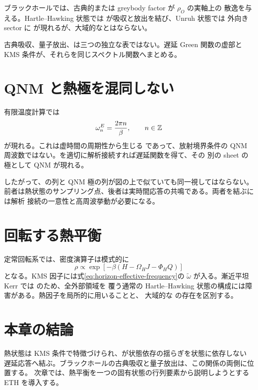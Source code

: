 ブラックホールでは、古典的または greybody factor が $\rho_O$ の実軸上の
散逸を与える。Hartle--Hawking 状態では が吸収と放出を結び、Unruh 状態では
外向き sector に が現れるが、大域的なとはならない。

\begin{principlebox}
古典吸収、量子放出、は三つの独立な表ではない。遅延 Green 関数の虚部と
KMS 条件が、それらを同じスペクトル関数へまとめる。
\end{principlebox}

\section{QNM と熱極を混同しない}

有限温度計算では 
\begin{equation}
\omega_n^{E}
=
\frac{2\pi n}{\beta},
\qquad
n\in\mathbb{Z}
\label{eq:bosonic-matsubara}
\end{equation}
が現れる。これは虚時間の周期性から生じる であって、放射境界条件の
QNM 周波数ではない。を適切に解析接続すれば遅延関数を得て、その
別の sheet の極として QNM が現れる。

したがって、の列と QNM 極の列が図の上で似ていても同一視してはならない。
前者は熱状態のサンプリング点、後者は実時間応答の共鳴である。両者を結ぶには解析
接続の一意性と高周波挙動が必要になる。

\section{回転する熱平衡}

定常回転系では、密度演算子は模式的に
\begin{equation}
\rho
\mathrel{\propto}
\exp\left[
-\beta
\left(
H-\Omega_H J-\Phi_H Q
\right)
\right]
\label{eq:rotating-gibbs}
\end{equation}
となる。KMS 因子には式\eqref{eq:horizon-effective-frequency}の
$\widetilde\omega$ が入る。漸近平坦 Kerr では  のため、全外部領域を
覆う通常の Hartle--Hawking 状態の構成には障害がある。熱因子を局所的に用いることと、
大域的な の存在を区別する。

\section{本章の結論}

熱状態は KMS 条件で特徴づけられ、が状態依存の揺らぎを状態に依存しない
遅延応答へ結ぶ。ブラックホールの古典吸収と量子放出は、この関係の両側に位置する。
次章では、熱平衡を一つの固有状態の行列要素から説明しようとする ETH を導入する。
